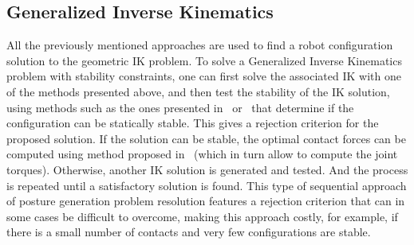 \subsection{Generalized Inverse Kinematics}
\label{sub:generalized_inverse_kinematics}

All the previously mentioned approaches are used to find a robot configuration solution to the geometric IK problem.
To solve a Generalized Inverse Kinematics problem with stability constraints, one can first solve the associated IK with one of the methods presented above, and then test the stability of the IK solution, using methods such as the ones presented in~\cite{bretl:itro:2008} or~\cite{rimon2008general} that determine if the configuration can be statically stable.
This gives a rejection criterion for the proposed solution.
If the solution can be stable, the optimal contact forces can be computed using method proposed in~\cite{boyd2007fast} (which in turn allow to compute the joint torques).
Otherwise, another IK solution is generated and tested.
And the process is repeated until a satisfactory solution is found.
This type of sequential approach of posture generation problem resolution features a rejection criterion that can in some cases be difficult to overcome, making this approach costly, for example, if there is a small number of contacts and very few configurations are stable.


